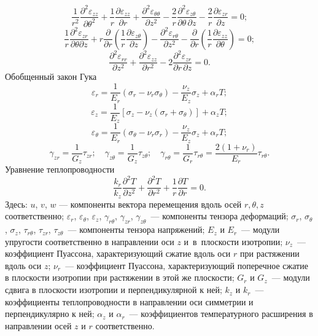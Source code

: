 \documentclass[press]{vestnik}
\begin{document}
\[
\frac{1}{r^{2}}\frac{\partial^{2}\varepsilon_{zz} }{\partial \theta 
^{2}}+\frac{1}{r}\frac{\partial \varepsilon_{zz} }{\partial 
r}+\frac{\partial^{2}\varepsilon_{\theta \theta } }{\partial 
z^{2}}-\frac{2}{r}\frac{\partial^{2}\varepsilon_{z\theta } }{\partial 
\theta \,\partial z}-\frac{2}{r}\frac{\partial \varepsilon_{zr} }{\partial 
z}=0;
\]
\[
\frac{1}{r}\frac{\partial^{2}\varepsilon_{zr} }{\partial \theta \partial 
z}+r\frac{\partial }{\partial r}\left(\frac{1}{r}\frac{\partial \varepsilon 
_{z\theta } }{\partial z}\right)-\frac{\partial^{2}\varepsilon_{r\theta } 
}{\partial z^{2}}-\frac{\partial }{\partial r}\left(\frac{1}{r}\frac{\partial 
\varepsilon_{zz} }{\partial \theta }\right)=0;
\]
\[
\frac{\partial^{2}\varepsilon_{rr} }{\partial z^{2}}+\frac{\partial 
^{2}\varepsilon_{zz} }{\partial r^{2}}-2\frac{\partial^{2}\varepsilon 
_{zr} }{\partial r\,\partial z}=0.
\]
Обобщенный закон Гука~\cite{B12}
\[
\varepsilon_{r} =\frac{1}{E_{r} }(\sigma_{r} -\nu_{r} \sigma_{\theta } 
)-\frac{\nu_{z} }{E_{z} }\sigma_{z} +\alpha_{r} T;
\]
\begin{equation}
\label{eq4}
\varepsilon_{z} =\frac{1}{E_{z} }\left[ {\sigma_{z} -\nu_{z} (\sigma_{r} 
+\sigma_{\theta } )} \right]+\alpha_{z} T;
\end{equation}
\[
\varepsilon_{\theta } =\frac{1}{E_{r} }(\sigma_{\theta } -\nu_{r} \sigma 
_{r} )-\frac{\nu_{z} }{E_{z} }\sigma_{z} +\alpha_{r} T;
\]
\[
\gamma_{zr} =\frac{1}{G_{z} }\tau_{zr} ;
\quad
\gamma_{z\theta } =\frac{1}{G_{z} }\tau_{z\theta } ;
\quad
\gamma_{r\theta } =\frac{1}{G_{r} }\tau_{r\theta } =\frac{2(1+\nu_{r} 
)}{E_{r} }\tau_{r\theta } .
\]
Уравнение теплопроводности~\cite{B12}
\begin{equation}
\label{eq5}
\frac{k_{r} }{k_{z} }\frac{\partial^{2}T}{\partial z^{2}}+\frac{\partial 
^{2}T}{\partial r^{2}}+\frac{1}{r}\frac{\partial T}{\partial r}=0.
\end{equation}
Здесь: $u$, $v$, $w$ --- компоненты вектора перемещения вдоль осей $r,\theta ,z$ 
соответственно; $\varepsilon_{r} $, $\varepsilon_{\theta } $, $\varepsilon 
_{z} $, $\gamma_{r\theta } $, $\gamma_{zr} $, $\gamma_{z\theta } $~--- 
компоненты тензора деформаций; $\sigma_{r} $, $\sigma_{\theta } $, $\sigma 
_{z} $, $\tau_{r\theta } $, $\tau_{zr} $, $\tau_{z\theta } $~--- 
компоненты тензора напряжений; $E_{z} $ и $E_{r} $~--- модули упругости 
соответственно в направлении оси $z$ и~в~плоскости изотропии; $\nu_{z} $~--- 
коэффициент Пуассона, характеризующий сжатие вдоль оси $r$ при растяжении вдоль 
оси $z$; $\nu_{r} $~--- коэффициент Пуассона, характеризующий поперечное сжатие 
в плоскости изотропии при растяжении в этой же плоскости; $G_{r} $ и $G_{z} 
$~--- модули сдвига в плоскости изотропии и перпендикулярной к ней; $k_{z} $ 
и $k_{r} $~--- коэффициенты теплопроводности в направлении оси симметрии и 
перпендикулярно к ней; $\alpha_{z} $ и $\alpha_{r} $~--- коэффициентов 
температурного расширения в направлении осей $z$ и $r$ соответственно.
\end{document}
